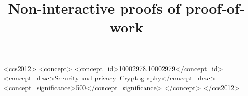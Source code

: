 \documentclass[sigconf,anonymous]{acmart}
\begin{document}
\title{Non-interactive proofs of proof-of-work}

\begin{abstract}
    
\end{abstract}

\begin{CCSXML}
    <ccs2012>
        <concept>
            <concept_id>10002978.10002979</concept_id>
            <concept_desc>Security and privacy~Cryptography</concept_desc>
            <concept_significance>500</concept_significance>
        </concept>
    </ccs2012>
\end{CCSXML}



\maketitle




% 

\end{document}
